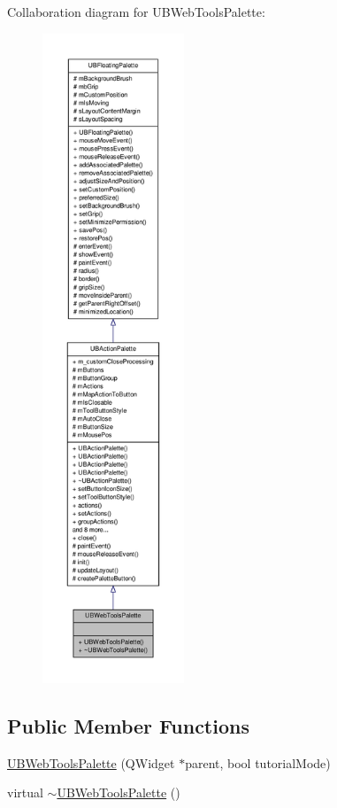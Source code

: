 Collaboration diagram for U\-B\-Web\-Tools\-Palette\-:
\nopagebreak
\begin{figure}[H]
\begin{center}
\leavevmode
\includegraphics[height=550pt]{d1/dc3/class_u_b_web_tools_palette__coll__graph}
\end{center}
\end{figure}
\subsection*{Public Member Functions}
\begin{DoxyCompactItemize}
\item 
\hyperlink{class_u_b_web_tools_palette_af683246ffc15ab2c4c75bca55afb0d19}{U\-B\-Web\-Tools\-Palette} (Q\-Widget $\ast$parent, bool tutorial\-Mode)
\item 
virtual \hyperlink{class_u_b_web_tools_palette_af34ba99ee7e346b0d196db4c1f4c86c6}{$\sim$\-U\-B\-Web\-Tools\-Palette} ()
\end{DoxyCompactItemize}
